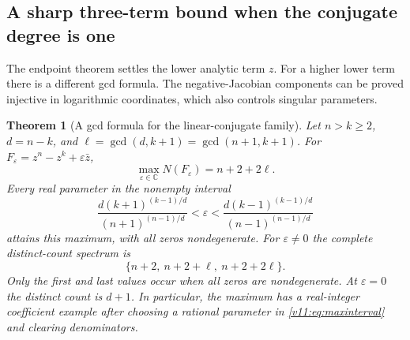 \documentclass[UTF8,11pt]{ctexart}
\newtheorem{thm}{Theorem}[section]
\theoremstyle{definition}
\numberwithin{equation}{section}
\newcommand{\C}{\mathbb C}\newcommand{\R}{\mathbb R}
\begin{document}
\subsection{A sharp three-term bound when the conjugate degree is one}
\label{v11:sec:linearsparse}

The endpoint theorem settles the lower analytic term $z$.
For a higher lower term there is a different gcd formula.
The negative-Jacobian components can be proved injective in
logarithmic coordinates, which also controls singular parameters.

\begin{thm}[A gcd formula for the linear-conjugate family]
\label{v11:thm:gcdmaximum}
Let $n>k\ge2$, $d=n-k$, and $\ell=\gcd(d,k+1)=\gcd(n+1,k+1)$.
For $F_\varepsilon=z^n-z^k+\varepsilon\bar z$,
\begin{equation}\label{v11:eq:familymaximum}
 \max_{\varepsilon\in\C}N(F_\varepsilon)=n+2+2\ell.
\end{equation}
Every real parameter in the nonempty interval
\begin{equation}\label{v11:eq:maxinterval}
 \frac{d(k+1)^{(k-1)/d}}{(n+1)^{(n-1)/d}}
 <\varepsilon<
 \frac{d(k-1)^{(k-1)/d}}{(n-1)^{(n-1)/d}}
\end{equation}
attains this maximum, with all zeros nondegenerate.
For $\varepsilon\ne0$ the complete distinct-count spectrum is
\begin{equation}\label{v11:eq:spectrum}
 \{n+2,\ n+2+\ell,\ n+2+2\ell\}.
\end{equation}
Only the first and last values occur when all zeros are nondegenerate.
At $\varepsilon=0$ the distinct count is $d+1$.
In particular, the maximum has a real-integer coefficient example
after choosing a rational parameter in \eqref{v11:eq:maxinterval}
and clearing denominators.
\end{thm}
\end{document}
